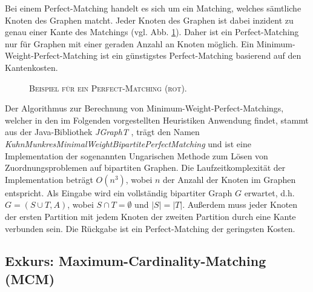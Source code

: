 Bei einem Perfect-Matching handelt es sich um ein Matching, welches sämtliche Knoten des Graphen matcht.
Jeder Knoten des Graphen ist dabei inzident zu genau einer Kante des Matchings (vgl. Abb. \ref{fig:perfect_matching}).
Daher ist ein Perfect-Matching nur für Graphen mit einer geraden Anzahl an Knoten möglich.
Ein Minimum-Weight-Perfect-Matching ist ein günstigstes Perfect-Matching basierend auf den Kantenkosten.
\begin{figure}[H]
\centering
{}
\caption{\textsc{Beispiel für ein Perfect-Matching (rot).}}
\label{fig:perfect_matching}
\end{figure}

Der Algorithmus zur Berechnung von Minimum-Weight-Perfect-Matchings, welcher in den im Folgenden
vorgestellten Heuristiken Anwendung findet, stammt aus der Java-Bibliothek \textit{JGraphT} \cite{JGraphT}, trägt
den Namen \textit{KuhnMunkresMinimalWeightBipartitePerfectMatching} und ist eine Implementation der
sogenannten Ungarischen Methode zum Lösen von Zuordnungsproblemen auf bipartiten Graphen.
Die Laufzeitkomplexität der Implementation beträgt $O(n^3)$, wobei $n$ der Anzahl der Knoten im Graphen entspricht.
Als Eingabe wird ein vollständig bipartiter Graph $G$ erwartet, d.h. $G= (S \cup T, A)$, wobei $S \cap T = \emptyset$ und
$|S| = |T|$. Außerdem muss jeder Knoten der ersten Partition mit jedem Knoten der zweiten Partition durch eine Kante verbunden sein.
Die Rückgabe ist ein Perfect-Matching der geringsten Kosten.

\subsection{Exkurs: Maximum-Cardinality-Matching (MCM)}
\label{sec:digression_mcm}

